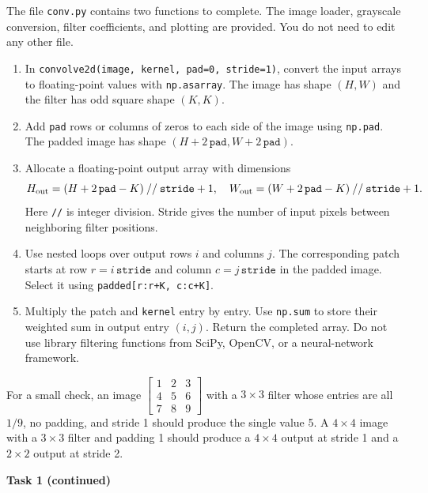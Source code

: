 \documentclass[11pt]{article}
\begin{document}
The file \texttt{conv.py} contains two functions to complete.
The image loader, grayscale conversion, filter coefficients, and plotting
are provided. You do not need to edit any other file.
\begin{enumerate}
\item In \texttt{convolve2d(image, kernel, pad=0, stride=1)}, convert
the input arrays to floating-point values with \texttt{np.asarray}.
The image has shape $(H,W)$ and the filter has odd square shape $(K,K)$.
\item Add \texttt{pad} rows or columns of zeros to each side of the
image using \texttt{np.pad}. The padded image has shape
$(H+2\,\texttt{pad},W+2\,\texttt{pad})$.
\item Allocate a floating-point output array with dimensions
\[
H_{\rm out}=(H+2\,\texttt{pad}-K)\mathbin{//}\texttt{stride}+1,\quad
W_{\rm out}=(W+2\,\texttt{pad}-K)\mathbin{//}\texttt{stride}+1.
\]
Here \texttt{//} is integer division. Stride gives the number of input
pixels between neighboring filter positions.
\item Use nested loops over output rows $i$ and columns $j$.
The corresponding patch starts at row
$r=i\,\texttt{stride}$ and column $c=j\,\texttt{stride}$ in the padded
image. Select it using \texttt{padded[r:r+K, c:c+K]}.
\item Multiply the patch and \texttt{kernel} entry by entry.
Use \texttt{np.sum} to store their weighted sum in output entry $(i,j)$.
Return the completed array. Do not use library filtering functions
from SciPy, OpenCV, or a neural-network framework.
\end{enumerate}

For a small check, an image
$\begin{bmatrix}1&2&3\\4&5&6\\7&8&9\end{bmatrix}$
with a $3\times3$ filter whose entries are all $1/9$, no padding, and
stride 1 should produce the single value 5. A $4\times4$ image with
a $3\times3$ filter and padding 1 should produce a $4\times4$ output
at stride 1 and a $2\times2$ output at stride 2.

\clearpage
\noindent\textbf{Task 1 (continued)}
\end{document}
